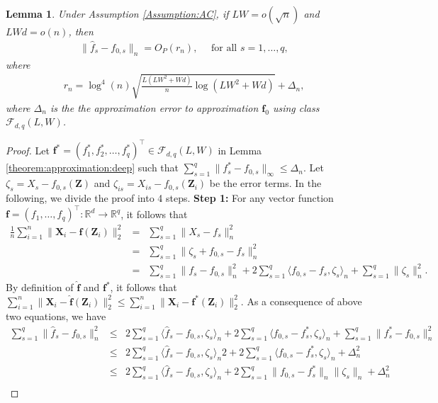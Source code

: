 \documentclass[11pt, preprint]{imsart}
\numberwithin{equation}{section}
\def \mcF{\mathcal{F}}
\def \bfX{\mathbf{X}}
\def \bfZ{\mathbf{Z}}
\def \bff{\mathbf{f}}
\def \bff{\mathbf{f}}
\theoremstyle{plain}
\newtheorem{lemma}{\indent Lemma}
\theoremstyle{definition}
\begin{document}
\begin{lemma}\label{lemma:rate:of:convergence}
Under Assumption \ref{Assumption:AC}, if $LW=o(\sqrt{n})$ and $LWd=o(n)$, then 
\begin{eqnarray}
	\|\widehat{f}_s-f_{0,s}\|_n=O_P(r_n),\quad \textrm{ for all } s=1,\ldots, q,\nonumber
\end{eqnarray}
where 
\begin{eqnarray}
	r_n=\log^4(n)\sqrt{\frac{L(LW^2+Wd)}{n}\log(LW^2+Wd)}+\Delta_n,\nonumber
\end{eqnarray}
where $\Delta_n$ is the the approximation error to approximation $\bff_0$ using class $\mcF_{d,q}(L, W)$.
\end{lemma}
\begin{proof}
Let $\bff^*=(f_1^*, f_2^*, \ldots, f_q^*)^\top \in \mcF_{d,q}(L, W)$ in Lemma \ref{theorem:approximation:deep} such that $\sum_{s=1}^q\|f_s^*-f_{0,s}\|_\infty\leq \Delta_n$. Let $\zeta_s=X_s-f_{0,s}(\bfZ)$ and $\zeta_{is}=X_{is}-f_{0,s}(\bfZ_i)$ be the error terms. In the following, we divide the proof into 4 steps. 
\newline
\noindent\textbf{Step 1:} For any vector function $\bff=(f_1,\ldots, f_q)^\top: \mathbb{R}^d \to \mathbb{R}^q$, it follows that
\begin{eqnarray*}
\frac{1}{n}\sum_{i=1}^n\|\bfX_i-\bff(\bfZ_i)\|_2^2&=&\sum_{s=1}^q\|X_s-f_s\|_n^2\nonumber\\
&=&
\sum_{s=1}^q\|\zeta_s+f_{0,s}-f_s\|_n^2\nonumber\\
&=&\sum_{s=1}^q\|f_s-f_{0,s}\|_n^2+2\sum_{s=1}^q\langle f_{0,s}-f_s, \zeta_s  \rangle_n+\sum_{s=1}^q\|\zeta_s\|_n^2.
\end{eqnarray*}
By definition of $\widehat{\bff}$ and $\bff^*$, it follows that $\sum_{i=1}^n\|\bfX_i-\widehat{\bff}(\bfZ_i)\|_2^2\leq \sum_{i=1}^n\|\bfX_i-{\bff^*}(\bfZ_i)\|_2^2$. As a consequence of above two equations, we have
\begin{eqnarray}
\sum_{s=1}^q\|\widehat{f}_s-f_{0,s}\|_n^2&\leq&2\sum_{s=1}^q\langle \widehat{f}_s- f_{0,s}, \zeta_s  \rangle_n+2\sum_{s=1}^q\langle f_{0,s}-f^*_s, \zeta_s  \rangle_n+\sum_{s=1}^q\|f_s^*-f_{0,s}\|_n^2\nonumber\\
&\leq&2\sum_{s=1}^q\langle \widehat{f}_s- f_{0,s}, \zeta_s  \rangle_n2+2\sum_{s=1}^q\langle f_{0,s}-f^*_s, \zeta_s  \rangle_n+\Delta_n^2\label{eq:lemma:rate:of:convergence:eq1}\\
&\leq&2\sum_{s=1}^q\langle \widehat{f}_s- f_{0,s}, \zeta_s  \rangle_n+2\sum_{s=1}^q\|f_{0,s}-f^*_s\|_n \|\zeta_s  \|_n+\Delta_n^2\nonumber\\

\end{eqnarray}
\end{proof}
\end{document}
